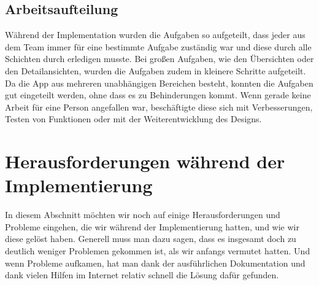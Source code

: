 \subsection{Arbeitsaufteilung}
\label{sec:implementierung:architektur:arbeitsaufteilung}

Während der Implementation wurden die Aufgaben so aufgeteilt, dass jeder aus dem Team immer für eine bestimmte Aufgabe zuständig war und diese durch alle Schichten durch erledigen musste. Bei großen Aufgaben, wie den Übersichten oder den Detailansichten, wurden die Aufgaben zudem in kleinere Schritte aufgeteilt. Da die App aus mehreren unabhängigen Bereichen besteht, konnten die Aufgaben gut eingeteilt werden, ohne dass es zu Behinderungen kommt. Wenn gerade keine Arbeit für eine Person angefallen war, beschäftigte diese sich mit Verbesserungen, Testen von Funktionen oder mit der Weiterentwicklung des Designs.

\section{Herausforderungen während der Implementierung}
\label{sec:implementierung:schwierigkeiten}	

In diesem Abschnitt möchten wir noch auf einige Herausforderungen und Probleme eingehen, die wir während der Implementierung hatten, und wie wir diese gelöst haben. Generell muss man dazu sagen, dass es insgesamt doch zu deutlich weniger Problemen gekommen ist, als wir anfangs vermutet hatten. Und wenn Probleme aufkamen, hat man dank der ausführlichen Dokumentation und dank vielen Hilfen im Internet relativ schnell die Lösung dafür gefunden.

